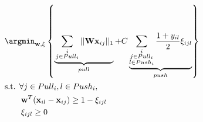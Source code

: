 \begin{equation}
\begin{aligned}
		&\displaystyle 		\argmin_{\textbf{w},\xi}
		\left\lbrace \underbrace{
		\vphantom{ \sum\limits_{i,j \rightsquigarrow i,l} \frac{1+y_{il}}{2} \xi_{ijl} }
			\sum\limits_{\substack{i \\ j \in Pull_i}} ||\textbf{W}\textbf{x}_{ij}||_1	
		}_{pull}					
		+	
		C \underbrace{				
			\sum\limits_{\substack{i \\ j \in Pull_i \\ l \in Push_i}} \frac{1+y_{il}}{2} \xi_{ijl}
		}_{push} \right\rbrace \\
 		&\text{s.t.  } \forall j \in Pull_i, l \in Push_i, \\
		& \qquad \textbf{w}^T(\textbf{x}_{il}-\textbf{x}_{ij}) \geq 1-\xi_{ijl}  \\
		& \qquad \xi_{ijl} \geq 0
		\label{eq:MMLPrimal} 
\end{aligned}
\end{equation}

